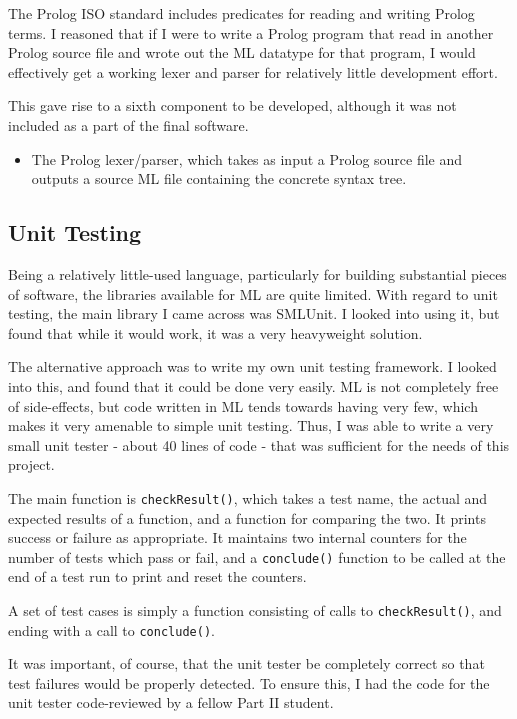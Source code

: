 \documentclass[12pt]{article}
\begin{document}
The Prolog ISO standard includes predicates for reading and writing Prolog terms. 
I reasoned that if I were to write a Prolog program that read in another Prolog source file and wrote out the ML datatype for that program, I would effectively get a working lexer and parser for relatively little development effort. 

This gave rise to a sixth component to be developed, although it was not included as a part of the final software.

\begin{itemize}
\item The Prolog lexer/parser, which takes as input a Prolog source file and outputs a source ML file containing the concrete syntax tree.
\end{itemize}

\subsection{Unit Testing}

Being a relatively little-used language, particularly for building substantial pieces of software, the libraries available for ML are quite limited. 
With regard to unit testing, the main library I came across was SMLUnit. 
I looked into using it, but found that while it would work, it was a very heavyweight solution.

The alternative approach was to write my own unit testing framework. 
I looked into this, and found that it could be done very easily. 
ML is not completely free of side-effects, but code written in ML tends towards having very few, which makes it very amenable to simple unit testing. 
Thus, I was able to write a very small unit tester - about 40 lines of code - that was sufficient for the needs of this project.

The main function is \verb|checkResult()|, which takes a test name, the actual and expected results of a function, and a function for comparing the two. 
It prints success or failure as appropriate. 
It maintains two internal counters for the number of tests which pass or fail, and a \verb|conclude()| function to be called at the end of a test run to print and reset the counters.

A set of test cases is simply a function consisting of calls to \verb|checkResult()|, and ending with a call to \verb|conclude()|.

It was important, of course, that the unit tester be completely correct so that test failures would be properly detected. 
To ensure this, I had the code for the unit tester code-reviewed by a fellow Part II student.
\end{document}
